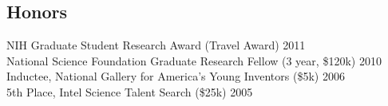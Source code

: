 \documentclass[margin]{res}
\newcommand{\nblocdatesubsection}[3]{#1 (#2) \hfill #3 }
\newcommand{\nbdatesubsection}[2]{#1 \hfill #2 }
\begin{document}
\begin{sloppypar}
\begin{resume}





\section{Honors}
\nblocdatesubsection{NIH Graduate Student Research Award}{Travel Award}{2011} \\
\nblocdatesubsection{National Science Foundation Graduate Research Fellow}{3 year, \$120k}{2010} \\
\nblocdatesubsection{Inductee, National Gallery for America's Young Inventors}{\$5k}{2006} \\
\nblocdatesubsection{5th Place, Intel Science Talent Search}{\$25k}{2005}


\end{resume}
\end{sloppypar}
\end{document}
